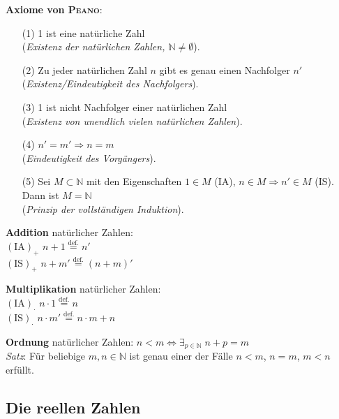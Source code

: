 \textbf{Axiome von \textsc{Peano}}:
\begin{itemize}
    \item[(1)] 1 ist eine natürliche Zahl \\
    (\emph{Existenz der natürlichen Zahlen, $\mathbb{N} \not= \emptyset$}).

    \item[(2)] Zu jeder natürlichen Zahl $n$ gibt es genau einen
    Nachfolger $n'$ \\
    (\emph{Existenz/Eindeutigkeit des Nachfolgers}).

    \item[(3)] 1 ist nicht Nachfolger einer natürlichen Zahl \\
    (\emph{Existenz von unendlich vielen natürlichen Zahlen}).

    \item[(4)] $n' = m' \Rightarrow n = m$ \\
    (\emph{Eindeutigkeit des Vorgängers}).

    \item[(5)] Sei $M \subset \mathbb{N}$ mit den Eigenschaften
    $1 \in M$ (IA), $n \in M \Rightarrow n' \in M$ (IS).
    Dann ist $M = \mathbb{N}$ \\
    (\emph{Prinzip der vollständigen Induktion}).
\end{itemize}

\linie

\textbf{Addition} natürlicher Zahlen: \\
$(\text{IA})_{\boldsymbol{+}}$ $n + 1 \overset{\text{def.}}{=} n'$ \\
$(\text{IS})_{\boldsymbol{+}}$ $n + m' \overset{\text{def.}}{=} (n + m)'$

\textbf{Multiplikation} natürlicher Zahlen: \\
$(\text{IA})_{\boldsymbol{\cdot}}$ $n \cdot 1 \overset{\text{def.}}{=} n$ \\
$(\text{IS})_{\boldsymbol{\cdot}}$ $n \cdot m' \overset{\text{def.}}{=}
n \cdot m + n$

\textbf{Ordnung} natürlicher Zahlen:
$n < m \Leftrightarrow \exists_{p \in \mathbb{N}}\; n + p = m$ \\
\emph{Satz}: Für beliebige $m, n \in \mathbb{N}$ ist genau einer der Fälle
$n < m$, $n = m$, $m < n$ erfüllt.

\pagebreak

\subsection{%
    Die reellen Zahlen%
}

